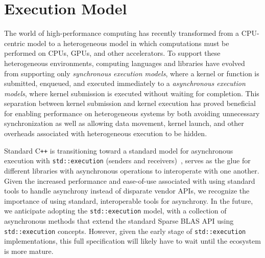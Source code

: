 \documentclass{article}
\newcommand{\cplusplus}{C\texttt{++}\xspace}
\begin{document}

\section{Execution Model}
\label{sec:async_api}

The world of high-performance computing has recently transformed from a CPU-centric model to a heterogeneous model in which computations must be performed on CPUs, GPUs, and other accelerators. To support these heterogeneous environments, computing languages and libraries have evolved from supporting only \textit{synchronous execution models}, where a kernel or function is submitted, enqueued, and executed immediately to a \textit{asynchronous execution models}, where kernel submission is executed without waiting for completion. This separation between kernel submission and kernel execution has proved beneficial for enabling performance on heterogeneous systems by both avoiding unnecessary synchronization as well as allowing data movement, kernel launch, and other overheads associated with heterogeneous execution to be hidden.

Standard \cplusplus is transitioning toward a
standard model for asynchronous execution with \texttt{std::execution} (senders and receivers)~\cite{p2300r7,p3300r0}, serves as the glue for different libraries with asynchronous operations to interoperate with one another.  Given the increased performance and ease-of-use associated with using standard tools to handle asynchrony instead of disparate vendor APIs, we recognize the importance of using standard, interoperable tools for asynchrony. In the future, we anticipate adopting the \texttt{std::execution} model, with a collection of asynchronous methods that extend the standard Sparse BLAS API using \texttt{std::execution} concepts.  However, given the early stage of \texttt{std::execution} implementations, this full specification will likely have to wait until the ecosystem is more mature.
\end{document}
